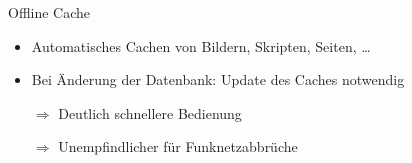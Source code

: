 \begin{frame}{Offline Cache}
	\begin{itemize}
		\item Automatisches Cachen von Bildern, Skripten, Seiten, \dots
		\item Bei Änderung der Datenbank: Update des Caches notwendig
	\end{itemize}
	\begin{itemize}
		\item[$\Rightarrow$] Deutlich schnellere Bedienung
		\item[$\Rightarrow$] Unempfindlicher für Funknetzabbrüche
	\end{itemize}
\end{frame}

		

		
